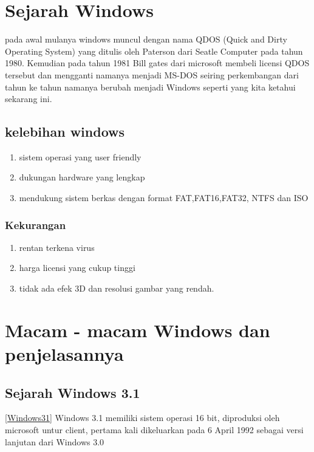 
\section{Sejarah Windows}
	pada awal mulanya windows muncul dengan nama QDOS (Quick and Dirty Operating System) yang ditulis oleh Paterson dari Seatle Computer pada tahun 1980.
Kemudian pada tahun 1981 Bill gates dari microsoft membeli licensi QDOS tersebut dan mengganti namanya menjadi MS-DOS seiring perkembangan dari tahun ke tahun namanya berubah menjadi Windows seperti yang kita ketahui sekarang ini.
\subsection{kelebihan windows}
\begin{enumerate}
	\item sistem operasi yang user friendly
	\item dukungan hardware yang lengkap
	\item mendukung sistem berkas dengan format FAT,FAT16,FAT32, NTFS dan ISO
\end{enumerate}
\subsubsection{Kekurangan}
\begin{enumerate}
	\item rentan terkena virus
	\item harga licensi yang cukup tinggi
	\item tidak ada efek 3D dan resolusi gambar yang rendah.
\end{enumerate}

\section{Macam - macam Windows dan penjelasannya}

\subsection{Sejarah Windows 3.1}
\ref{Windows31}
	Windows 3.1 memiliki sistem operasi 16 bit, diproduksi oleh microsoft untur client, pertama kali dikeluarkan pada 6 April 1992 sebagai versi lanjutan dari Windows 3.0 \cite{brodsky1996just}
